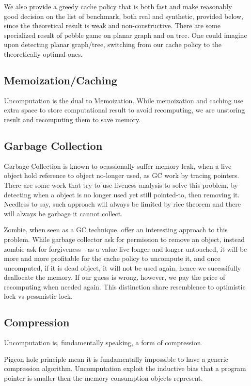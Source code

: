 We also provide a greedy cache policy that is both fast and make reasonably good decision on the list of benchmark, both real and synthetic, provided below, since the theoretical result is weak and non-constructive. There are some specialized result of pebble game on planar graph and on tree. One could imagine upon detecting planar graph/tree, switching from our cache policy to the theoretically optimal ones.
\subsection{Memoization/Caching}
Uncomputation is the dual to Memoization. While memoization and caching use extra space to store computational result to avoid recomputing, we are unstoring result and recomputing them to save memory.
\subsection{Garbage Collection}
Garbage Collection is known to ocassionally suffer memory leak, when a live object hold reference to object no-longer used, as GC work by tracing pointers. There are some work that try to use liveness analysis to solve this problem, by detecting when a object is no longer used yet still pointed-to, then removing it. Needless to say, such approach will always be limited by rice theorem and there will always be garbage it cannot collect.

Zombie, when seen as a GC technique, offer an interesting approach to this problem. While garbage collector ask for permission to remove an object, instead zombie ask for forgiveness - as a value live longer and longer untouched, it will be more and more profitable for the cache policy to uncompute it, and once uncomputed, if it is dead object, it will not be used again, hence we sucessifully deallocate the memory. If our guess is wrong, however, we pay the price of recomputing when needed again. This distinction share resemblence to optimistic lock vs pessmistic lock.
\subsection{Compression}
Uncomputation is, fundamentally speaking, a form of compression.

Pigeon hole principle mean it is fundamentally impossible to have a generic compression algorithm. Uncomputation exploit the inductive bias that a program pointer is smaller then the memory consumption objects represent.

